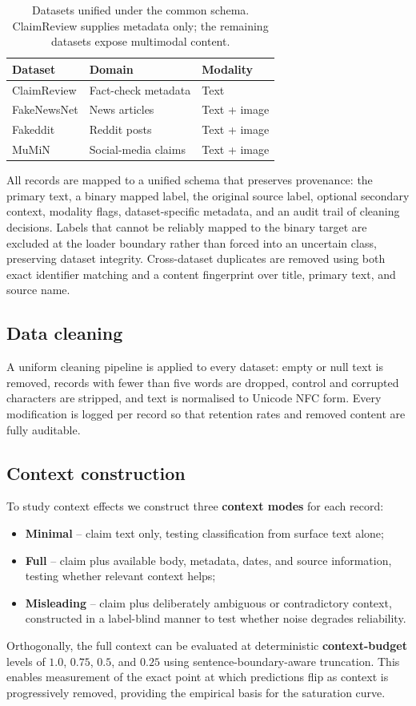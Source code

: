 \documentclass[11pt]{article}
\begin{document}
\begin{table}[t]
\centering
\small
\begin{tabular}{@{}lll@{}}
\toprule
\textbf{Dataset} & \textbf{Domain} & \textbf{Modality} \\
\midrule
ClaimReview  & Fact-check metadata & Text \\
FakeNewsNet  & News articles       & Text + image \\
Fakeddit     & Reddit posts        & Text + image \\
MuMiN        & Social-media claims & Text + image \\
\bottomrule
\end{tabular}
\caption{Datasets unified under the common schema. ClaimReview supplies metadata only; the remaining datasets expose multimodal content.}
\label{tab:datasets}
\end{table}

All records are mapped to a unified schema that preserves provenance: the primary text, a binary mapped label, the original source label, optional secondary context, modality flags, dataset-specific metadata, and an audit trail of cleaning decisions. Labels that cannot be reliably mapped to the binary target are excluded at the loader boundary rather than forced into an uncertain class, preserving dataset integrity. Cross-dataset duplicates are removed using both exact identifier matching and a content fingerprint over title, primary text, and source name.

\subsection{Data cleaning}
A uniform cleaning pipeline is applied to every dataset: empty or null text is removed, records with fewer than five words are dropped, control and corrupted characters are stripped, and text is normalised to Unicode NFC form. Every modification is logged per record so that retention rates and removed content are fully auditable.

\subsection{Context construction}
To study context effects we construct three \textbf{context modes} for each record:
\begin{itemize}
  \item \textbf{Minimal} -- claim text only, testing classification from surface text alone;
  \item \textbf{Full} -- claim plus available body, metadata, dates, and source information, testing whether relevant context helps;
  \item \textbf{Misleading} -- claim plus deliberately ambiguous or contradictory context, constructed in a label-blind manner to test whether noise degrades reliability.
\end{itemize}
Orthogonally, the full context can be evaluated at deterministic \textbf{context-budget} levels of $1.0$, $0.75$, $0.5$, and $0.25$ using sentence-boundary-aware truncation. This enables measurement of the exact point at which predictions flip as context is progressively removed, providing the empirical basis for the saturation curve.
\end{document}
